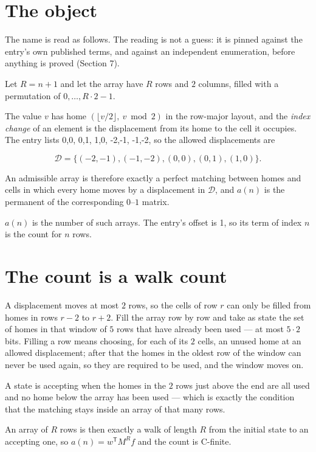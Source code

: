 \documentclass[11pt]{article}
\theoremstyle{definition}
\begin{document}
\section{The object}

The name is read as follows. The reading is not a guess: it is pinned against the entry's own published terms, and against an independent enumeration, before anything is proved (Section 7).

Let $R = n + 1$ and let the array have $R$ rows and $2$ columns, filled with a permutation of $0,\dots,R\cdot2-1$.

The value $v$ has home $(\lfloor v/2\rfloor,\ v \bmod 2)$ in the row-major layout, and the {\itshape index change} of an element is the displacement from its home to the cell it occupies. The entry lists 0,0, 0,1, 1,0, -2,-1, -1,-2, so the allowed displacements are

\[\mathcal{D} = \{(-2,-1), (-1,-2), (0,0), (0,1), (1,0)\}.\]

An admissible array is therefore exactly a perfect matching between homes and cells in which every home moves by a displacement in $\mathcal{D}$, and $a(n)$ is the permanent of the corresponding $0$--$1$ matrix.

$a(n)$ is the number of such arrays. The entry's offset is 1, so its term of index $n$ is the count for $n$ rows.

\section{The count is a walk count}

A displacement moves at most $2$ rows, so the cells of row $r$ can only be filled from homes in rows $r-2$ to $r+2$. Fill the array row by row and take as state the set of homes in that window of $5$ rows that have already been used --- at most $5\cdot2$ bits. Filling a row means choosing, for each of its $2$ cells, an unused home at an allowed displacement; after that the homes in the oldest row of the window can never be used again, so they are required to be used, and the window moves on.

A state is accepting when the homes in the $2$ rows just above the end are all used and no home below the array has been used --- which is exactly the condition that the matching stays inside an array of that many rows.

An array of $R$ rows is then exactly a walk of length $R$ from the initial state to an accepting one, so $a(n) = w^{\mathsf T}M^{R}f$ and the count is C-finite.
\end{document}
